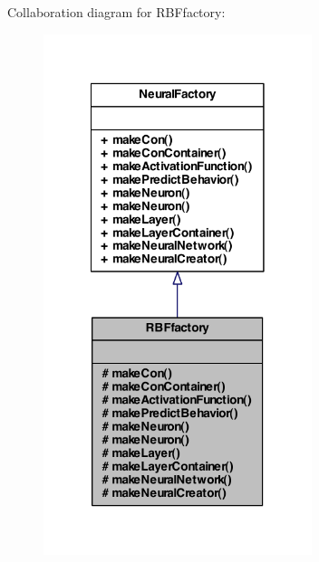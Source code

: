 Collaboration diagram for RBFfactory:\nopagebreak
\begin{figure}[H]
\begin{center}
\leavevmode
\includegraphics[width=222pt]{class_r_b_ffactory__coll__graph}
\end{center}
\end{figure}
